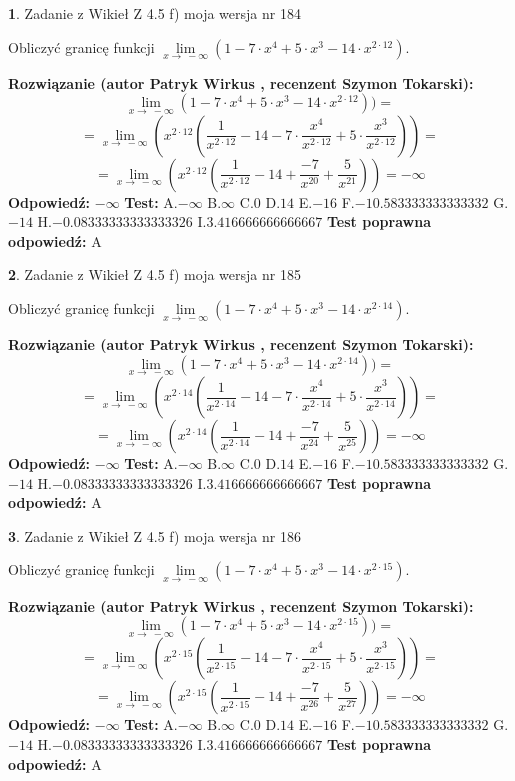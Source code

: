 \documentclass[12pt, a4paper]{article}
\theoremstyle{definition} %
\newtheorem{zad}{}
\newcommand{\zadStart}[1]{\begin{zad}#1\newline}
\newcommand{\zadStop}{\end{zad}}
\newcommand{\rozwStart}[2]{\noindent \textbf{Rozwiązanie (autor #1 , recenzent #2): }\newline}
\newcommand{\rozwStop}{\newline}
\newcommand{\odpStart}{\noindent \textbf{Odpowiedź:}\newline}
\newcommand{\odpStop}{\newline}
\newcommand{\testStart}{\noindent \textbf{Test:}\newline}
\newcommand{\testStop}{\newline}
\newcommand{\kluczStart}{\noindent \textbf{Test poprawna odpowiedź:}\newline}
\newcommand{\kluczStop}{\newline}
\begin{document}
\zadStart{Zadanie z Wikieł Z 4.5 f) moja wersja nr 184}


Obliczyć granicę funkcji  $\lim\limits_{x\to\ -\infty}(1 - 7 \cdot x^{4}+5 \cdot x^{3}- 14 \cdot x^{2\cdot12})$.
\zadStop
\rozwStart{Patryk Wirkus}{Szymon Tokarski}
$$\lim\limits_{x\to\ -\infty}(1 - 7 \cdot x^{4}+5 \cdot x^{3}- 14 \cdot x^{2\cdot12}))=$$
$$=\lim\limits_{x\to\ -\infty}(x^{2\cdot12}(\frac{1}{x^{2\cdot12}}-14 -7 \cdot \frac{x^{4}}{x^{2\cdot12}}+5 \cdot \frac{x^{3}}{x^{2\cdot12}}))=$$
$$=\lim\limits_{x\to\ -\infty}(x^{2\cdot12}(\frac{1}{x^{2\cdot12}}-14 + \frac{-7}{x^{20}}+ \frac{5}{x^{21}}))=-\infty$$
\rozwStop
\odpStart
$-\infty$
\odpStop
\testStart
A.$-\infty$ B.$\infty$ C.$0$ D.$14$ E.$-16$
F.$-10.583333333333332$ G.$-14$
H.$-0.08333333333333326$
I.$3.416666666666667$
\testStop
\kluczStart
A
\kluczStop



\zadStart{Zadanie z Wikieł Z 4.5 f) moja wersja nr 185}


Obliczyć granicę funkcji  $\lim\limits_{x\to\ -\infty}(1 - 7 \cdot x^{4}+5 \cdot x^{3}- 14 \cdot x^{2\cdot14})$.
\zadStop
\rozwStart{Patryk Wirkus}{Szymon Tokarski}
$$\lim\limits_{x\to\ -\infty}(1 - 7 \cdot x^{4}+5 \cdot x^{3}- 14 \cdot x^{2\cdot14}))=$$
$$=\lim\limits_{x\to\ -\infty}(x^{2\cdot14}(\frac{1}{x^{2\cdot14}}-14 -7 \cdot \frac{x^{4}}{x^{2\cdot14}}+5 \cdot \frac{x^{3}}{x^{2\cdot14}}))=$$
$$=\lim\limits_{x\to\ -\infty}(x^{2\cdot14}(\frac{1}{x^{2\cdot14}}-14 + \frac{-7}{x^{24}}+ \frac{5}{x^{25}}))=-\infty$$
\rozwStop
\odpStart
$-\infty$
\odpStop
\testStart
A.$-\infty$ B.$\infty$ C.$0$ D.$14$ E.$-16$
F.$-10.583333333333332$ G.$-14$
H.$-0.08333333333333326$
I.$3.416666666666667$
\testStop
\kluczStart
A
\kluczStop



\zadStart{Zadanie z Wikieł Z 4.5 f) moja wersja nr 186}


Obliczyć granicę funkcji  $\lim\limits_{x\to\ -\infty}(1 - 7 \cdot x^{4}+5 \cdot x^{3}- 14 \cdot x^{2\cdot15})$.
\zadStop
\rozwStart{Patryk Wirkus}{Szymon Tokarski}
$$\lim\limits_{x\to\ -\infty}(1 - 7 \cdot x^{4}+5 \cdot x^{3}- 14 \cdot x^{2\cdot15}))=$$
$$=\lim\limits_{x\to\ -\infty}(x^{2\cdot15}(\frac{1}{x^{2\cdot15}}-14 -7 \cdot \frac{x^{4}}{x^{2\cdot15}}+5 \cdot \frac{x^{3}}{x^{2\cdot15}}))=$$
$$=\lim\limits_{x\to\ -\infty}(x^{2\cdot15}(\frac{1}{x^{2\cdot15}}-14 + \frac{-7}{x^{26}}+ \frac{5}{x^{27}}))=-\infty$$
\rozwStop
\odpStart
$-\infty$
\odpStop
\testStart
A.$-\infty$ B.$\infty$ C.$0$ D.$14$ E.$-16$
F.$-10.583333333333332$ G.$-14$
H.$-0.08333333333333326$
I.$3.416666666666667$
\testStop
\kluczStart
A
\kluczStop
\end{document}
